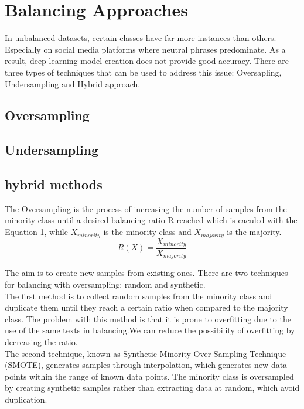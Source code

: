 \documentclass[conference]{IEEEtran}
\begin{document}
	\section{Balancing Approaches}

	In unbalanced datasets, certain classes have far more instances than others. Especially on social media platforms where neutral phrases predominate. As a result, deep learning model creation does not provide good accuracy.  There are three types of techniques that can be used to address this issue: Oversapling, Undersampling and Hybrid approach.\\
	\subsection{Oversampling}
	\subsection{Undersampling}
	\subsection{hybrid methods}	
	The Oversampling is the process of increasing the number of samples from the minority class until a desired balancing ratio R reached which is  caculed with the Equation 1, while $X_{minority}$ is the minority class and $X_{majority}$ is the majority.
	\begin{equation}
	R(X)= \frac{X_{minority}}{X_{majority}}
	\end{equation}
	
	The aim is to create new samples from existing ones. There are two techniques for balancing with oversampling: random and synthetic.\\
	The first method is to collect random samples from the minority class and duplicate them until they reach a certain ratio when compared to the majority class. The problem with this method is that it is prone to overfitting due to the use of the same texts in balancing.We can reduce the possibility of overfitting by decreasing the ratio. \\
	
	The second technique, known as Synthetic Minority Over-Sampling Technique (SMOTE), generates samples through interpolation, which generates new data points within the range of known data points.
	The minority class is oversampled by creating synthetic samples rather than extracting data at random, which avoid duplication.\\
	
\end{document}
